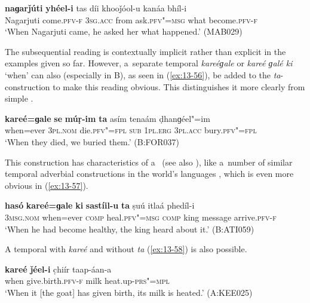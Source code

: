 \begin{exe}
\ex
\label{ex:13-55}
\gll \textbf{naɡarǰúti} \textbf{yhéel-i} tas díi khooǰóol-u kanáa bhíl-i \\
Nagarjuti come.\textsc{pfv-f} \textsc{3sg.acc} from ask.\textsc{pfv"=msg}  what become.\textsc{pfv-f} \\
\glt `When Nagarjuti came, he asked her what happened.' (MAB029) 
\end{exe}

The subsequential reading is contextually implicit rather than explicit in the examples given so far. However, a~separate temporal  \textit{kareéɡale} or \textit{kareé ɡalé ki} `when' can also (especially in B), as seen in (\ref{ex:13-56}), be added to the \textit{ta}-construction to make this reading obvious. This distinguishes it more clearly from simple .

\begin{exe}
\ex
\label{ex:13-56}
\gll \textbf{kareé=ɡale} \textbf{se} \textbf{múṛ-im} \textbf{ta} asím tenaám ḍhanɡéel"=im \\
when=ever \textsc{3pl.nom} die.\textsc{pfv"=fpl} \textsc{sub} \textsc{1pl.erg} \textsc{3pl.acc} bury.\textsc{pfv"=fpl} \\
\glt `When they died, we buried them.' (B:FOR037) 
\end{exe}

This construction has characteristics of a~ (see also ), like a~number of similar temporal adverbial constructions in the world's languages \citep[246--247]{thompsonetal2007}, which is even more obvious in (\ref{ex:13-57}).

\ea
\label{ex:13-57}
\gll \textbf{hasó} \textbf{kareé=ɡale} \textbf{ki} \textbf{sastíil-u} \textbf{ta} ṣuú itlaá phedíl-i\\
\textsc{3msg.nom} when=ever \textsc{comp} heal.\textsc{pfv"=msg} \textsc{comp} king message arrive.\textsc{pfv-f}\\
\glt `When he had become healthy, the king heard about it.' (B:ATI059) 
\z

A  temporal  with \textit{kareé} and without \textit{ta} (\ref{ex:13-58}) is also possible.

\begin{exe}
\ex
\label{ex:13-58}
\gll \textbf{kareé} \textbf{ǰéel-i} c̣hiír taap-áan-a \\
when give.birth.\textsc{pfv-f} milk heat.up-\textsc{prs"=mpl} \\
\glt `When it [the goat] has given birth, its milk is heated.' (A:KEE025) 
\end{exe}

